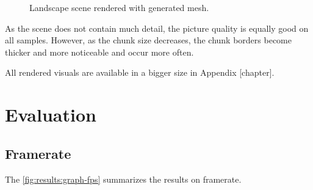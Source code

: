 \begin{figure}[h]
    \caption{Landscape scene rendered with generated mesh.}
\end{figure}

As the scene does not contain much detail, the picture quality is equally good on all samples. However, as the chunk size decreases, the chunk borders become thicker and more noticeable and occur more often.

All rendered visuals are available in a bigger size in Appendix [chapter].

\section{Evaluation}

\subsection{Framerate}

The \autoref{fig:results:graph-fps} summarizes the results on framerate.

